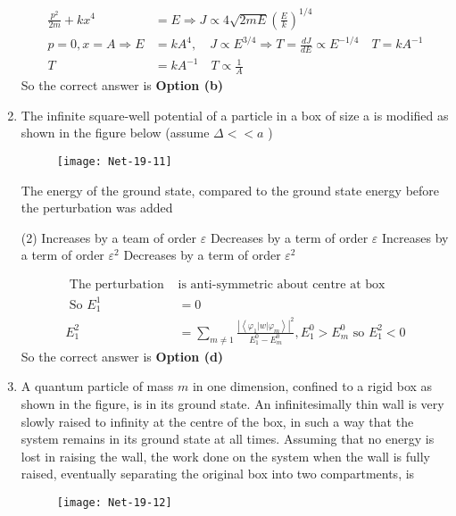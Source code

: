 \begin{enumerate}
\begin{answer}
\begin{align*}
	\frac{p^{2}}{2 m}+k x^{4}&=E \Rightarrow J \propto 4 \sqrt{2 m E}\left(\frac{E}{k}\right)^{1 / 4}\\
	p=0, x=A \Rightarrow E&=k A^{4}, \quad J \propto E^{3 / 4} \Rightarrow T=\frac{d J}{d E} \propto E^{-1 / 4} \quad T=k A^{-1}\\
	T&=k A^{-1} \quad T \propto \frac{1}{A}
	\end{align*}
		So the correct answer is \textbf{Option (b)}
\end{answer}
\item  The infinite square-well potential of a particle in a box of size a is modified as shown in the figure below (assume $\Delta<<a$ )
\begin{figure}[H]
	\centering
	\texttt{[image: Net-19-11]}
\end{figure}
The energy of the ground state, compared to the ground state energy before the perturbation was added
 \begin{tasks}(2)
	\task[\textbf{a.}]Increases by a team of order $\varepsilon$
	\task[\textbf{b.}] Decreases by a term of order $\varepsilon$
	\task[\textbf{c.}]Increases by a term of order $\varepsilon^{2}$
	\task[\textbf{d.}]  Decreases by a term of order $\varepsilon^{2}$
\end{tasks}
\begin{answer}
	\begin{align*}
	\text { The perturbation  }&\text{is anti-symmetric about centre at box}\\
\text{	So }E_{1}^{1}&=0\\
	E_{1}^{2}&=\sum_{m \neq 1} \frac{\left|\left\langle\varphi_{1}|w| \varphi_{m}\right\rangle\right|^{2}}{E_{1}^{0}-E_{m}^{0}}, E_{1}^{0}>E_{m}^{0} \text { so } E_{1}^{2}<0
	\end{align*}
		So the correct answer is \textbf{Option (d)}
\end{answer}
\item  A quantum particle of mass $m$ in one dimension, confined to a rigid box as shown in the figure, is in its ground state. An infinitesimally thin wall is very slowly raised to infinity at the centre of the box, in such a way that the system remains in its ground state at all times. Assuming that no energy is lost in raising the wall, the work done on the system when the wall is fully raised, eventually separating the original box into two compartments, is
\begin{figure}[H]
	\centering
	\texttt{[image: Net-19-12]}
\end{figure}

\end{enumerate}
